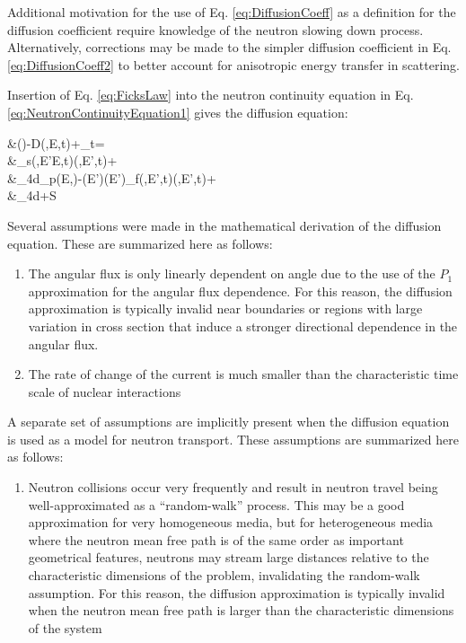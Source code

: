 Additional motivation for the use of Eq. \eqref{eq:DiffusionCoeff} as a definition for the diffusion coefficient require knowledge of the neutron slowing down process. Alternatively, corrections may be made to the simpler diffusion coefficient in Eq. \eqref{eq:DiffusionCoeff2} to better account for anisotropic energy transfer in scattering.

Insertion of Eq. \eqref{eq:FicksLaw} into the neutron continuity equation in Eq. \eqref{eq:NeutronContinuityEquation1} gives the diffusion equation:

\beqa
\label{eq:DiffusionEquation}
&\left(\right)-\nabla\cdot\left\lbrack D\nabla\phi(,E,t)\right\rbrack+\Sigma_t\sset\phi\sset=\\
&\hspace{1cm}\dEprime\Sigma_s(,E'\rightarrow E,t)\phi(,E',t)+\\
&\hspace{2cm}\int_{4\pi}d\hO\chi_p(E,\hO)\dEprime\left{}-\beta(E')\right\rbrack\nu(E')\Sigma_f(,E',t)\phi(,E',t)+\\
&\hspace{3cm}\int_{4\pi}d\hO\delayedfissionsource+S\sset
\eeqa

Several assumptions were made in the mathematical derivation of the diffusion equation. These are summarized here as follows:

\begin{enumerate}
\item The angular flux is only linearly dependent on angle due to the use of the \(P_1\) approximation for the angular flux dependence. For this reason, the diffusion approximation is typically invalid near boundaries or regions with large variation in cross section that induce a stronger directional dependence in the angular flux.
\item The rate of change of the current is much smaller than the characteristic time scale of nuclear interactions
\end{enumerate}

A separate set of assumptions are implicitly present when the diffusion equation is used as a model for neutron transport. These assumptions are summarized here as follows:

\begin{enumerate}
\item Neutron collisions occur very frequently and result in neutron travel being well-approximated as a ``random-walk'' process. This may be a good approximation for very homogeneous media, but for heterogeneous media where the neutron mean free path is of the same order as important geometrical features, neutrons may stream large distances relative to the characteristic dimensions of the problem, invalidating the random-walk assumption. For this reason, the diffusion approximation is typically invalid when the neutron mean free path is larger than the characteristic dimensions of the system %
\end{enumerate}

